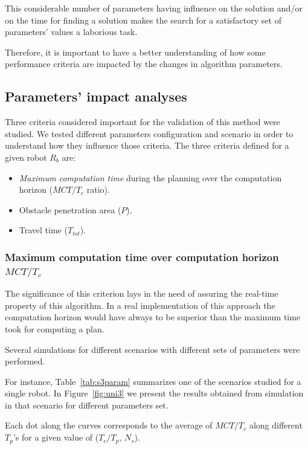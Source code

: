 \documentclass[eprint]{actapoly}
\begin{document}
This considerable number of parameters having influence on the solution
and/or on the time for finding a solution makes the search for a
satisfactory set of parameters' values a laborious task.

Therefore, it is important to have a better understanding of how some
performance criteria are impacted by the changes in algorithm
parameters.

\subsection{Parameters' impact analyses}

Three criteria considered important for the validation of this method were studied.
We tested different parameters configuration and scenario in order to 
understand how they influence
those criteria.
The three criteria defined for a given robot $R_b$ are:

\begin{itemize}

\item
\textit{Maximum computation time} during the planning over the computation horizon ($MCT/T_c$ 
ratio).

\item
Obstacle penetration area ($P$).

\item
Travel time ($T_{tot}$).

\end{itemize}

\subsubsection{Maximum computation time over computation horizon $MCT/T_c$}

The significance of this criterion lays in the need of assuring the 
real-time property of this algorithm.
In a real implementation of this approach the computation horizon would have 
always to be superior than the
maximum time took for computing a plan.

Several simulations for different scenarios with different sets of parameters were
performed.

For instance, Table~\ref{tab:s3param} summarizes one of the scenarios studied for a 
single robot. In Figure~\ref{fig:uni3} we present the results obtained from simulation in 
that scenario for different parameters set.

Each dot along the curves corresponds to the average of $MCT/T_c$ along different $T_p$'s for a given value of ($T_c/T_p$, $N_s$).
\end{document}
